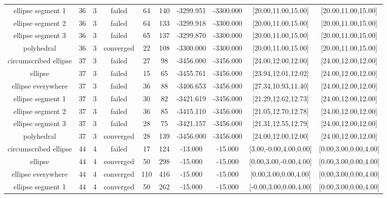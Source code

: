\begin{tiny}
\begin{center}
\begin{tabular}{ c c c c c c c c c c }
    ellipse segment 1     &   36  &  3  &   failed   &   64  &  140  & -3299.951  & -3300.000  & [20.00,11.00,15.00] & [20.00,11.00,15.00] \\
    ellipse segment 2     &   36  &  3  &   failed   &   64  &  133  & -3299.918  & -3300.000  & [20.00,11.00,15.00] & [20.00,11.00,15.00] \\
    ellipse segment 3     &   36  &  3  &   failed   &   65  &  137  & -3299.870  & -3300.000  & [20.00,11.00,15.00] & [20.00,11.00,15.00] \\
        polyhedral        &   36  &  3  & converged  &   22  &  108  & -3300.000  & -3300.000  & [20.00,11.00,15.00] & [20.00,11.00,15.00] \\
  circumscribed ellipse   &   37  &  3  &   failed   &   27  &   98  & -3456.000  & -3456.000  & [24.00,12.00,12.00] & [24.00,12.00,12.00] \\
         ellipse          &   37  &  3  &   failed   &   15  &   65  & -3455.761  & -3456.000  & [23.94,12.01,12.02] & [24.00,12.00,12.00] \\
    ellipse everywhere    &   37  &  3  &   failed   &   36  &   88  & -3406.653  & -3456.000  & [27.34,10.93,11.40] & [24.00,12.00,12.00] \\
    ellipse segment 1     &   37  &  3  &   failed   &   30  &   82  & -3421.619  & -3456.000  & [21.29,12.62,12.73] & [24.00,12.00,12.00] \\
    ellipse segment 2     &   37  &  3  &   failed   &   36  &   85  & -3415.110  & -3456.000  & [21.05,12.70,12.78] & [24.00,12.00,12.00] \\
    ellipse segment 3     &   37  &  3  &   failed   &   28  &   75  & -3421.157  & -3456.000  & [21.31,12.55,12.79] & [24.00,12.00,12.00] \\
        polyhedral        &   37  &  3  & converged  &   28  &  139  & -3456.000  & -3456.000  & [24.00,12.00,12.00] & [24.00,12.00,12.00] \\
  circumscribed ellipse   &   44  &  4  &   failed   &   17  &  124  &  -13.000   &  -15.000   & [3.00,-0.00,4.00,0.00] & [0.00,3.00,0.00,4.00] \\
         ellipse          &   44  &  4  & converged  &   50  &  298  &  -15.000   &  -15.000   & [0.00,3.00,-0.00,4.00] & [0.00,3.00,0.00,4.00] \\
    ellipse everywhere    &   44  &  4  & converged  &  110  &  416  &  -15.000   &  -15.000   & [0.00,3.00,0.00,4.00] & [0.00,3.00,0.00,4.00] \\
    ellipse segment 1     &   44  &  4  & converged  &   50  &  262  &  -15.000   &  -15.000   & [-0.00,3.00,0.00,4.00] & [0.00,3.00,0.00,4.00] \\

\end{tabular}
\end{center}
\end{tiny}
